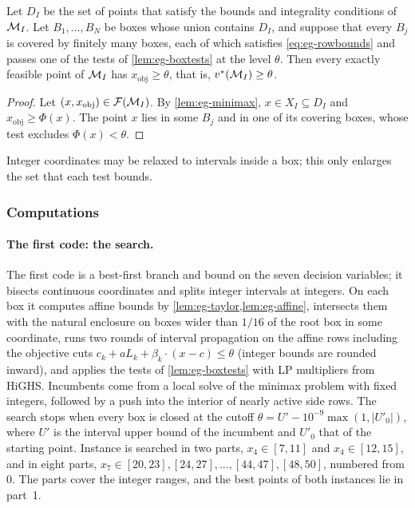 \begin{lemma}[coverage]\label{lem:eg-cover}
Let $D_I$ be the set of points that satisfy the bounds and integrality conditions of $\model_I$.
Let $B_1,\dots,B_N$ be boxes whose union contains $D_I$, and suppose that every $B_j$ is covered by finitely many boxes, each of which satisfies \eqref{eq:eg-rowbounds} and passes one of the tests of \cref{lem:eg-boxtests} at the level $\theta$.
Then every exactly feasible point of $\model_I$ has $x_{\mathrm{obj}}\ge\theta$, that is, $\vstar(\model_I)\ge\theta$.
\end{lemma}

\begin{proof}
Let $(x,x_{\mathrm{obj}})\in\feas[\model_I]$.
By \cref{lem:eg-minimax}, $x\in X_I\subseteq D_I$ and $x_{\mathrm{obj}}\ge\Phi(x)$.
The point $x$ lies in some $B_j$ and in one of its covering boxes, whose test excludes $\Phi(x)<\theta$.
\end{proof}

Integer coordinates may be relaxed to intervals inside a box; this only enlarges the set that each test bounds.

\subsubsection{Computations}\label{app:eg-computation}

\paragraph{The first code: the search.}
The first code is a best-first branch and bound on the seven decision variables; it bisects continuous coordinates and splits integer intervals at integers.
On each box it computes affine bounds by \cref{lem:eg-taylor,lem:eg-affine}, intersects them with the natural enclosure on boxes wider than $1/16$ of the root box in some coordinate, runs two rounds of interval propagation on the affine rows including the objective cuts $c_k+aL_k+\beta_k\cdot(x-c)\le\theta$ (integer bounds are rounded inward), and applies the tests of \cref{lem:eg-boxtests} with LP multipliers from HiGHS.
Incumbents come from a local solve of the minimax problem with fixed integers, followed by a push into the interior of nearly active side rows.
The search stops when every box is closed at the cutoff $\theta=U'-10^{-9}\max(1,|U'_0|)$, where $U'$ is the interval upper bound of the incumbent and $U'_0$ that of the starting point.
Instance  is searched in two parts, $x_4\in[7,11]$ and $x_4\in[12,15]$, and  in eight parts, $x_7\in[20,23],[24,27],\dots,[44,47],[48,50]$, numbered from 0.
The parts cover the integer ranges, and the best points of both instances lie in part~1.

